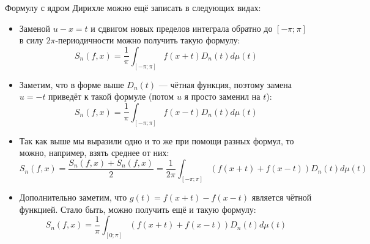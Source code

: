 \begin{note}
	Формулу с ядром Дирихле можно ещё записать в следующих видах:
	\begin{itemize}
		\item Заменой $u - x = t$ и сдвигом новых пределов интеграла обратно до $[-\pi; \pi]$ в силу $2\pi$-периодичности можно получить такую формулу:
		\[
			S_n(f, x) = \frac{1}{\pi} \int_{[-\pi; \pi]} f(x + t)D_n(t)d\mu(t)
		\]
		
		\item Заметим, что в форме выше $D_n(t)$ --- чётная функция, поэтому замена $u = -t$ приведёт к такой формуле (потом $u$ я просто заменил на $t$):
		\[
			S_n(f, x) = \frac{1}{\pi} \int_{[-\pi; \pi]} f(x - t)D_n(t)d\mu(t)
		\]
		
		\item Так как выше мы выразили одно и то же при помощи разных формул, то можно, например, взять среднее от них:
		\[
			S_n(f, x) = \frac{S_n(f, x) + S_n(f, x)}{2} = \frac{1}{2\pi} \int_{[-\pi; \pi]} (f(x + t) + f(x - t))D_n(t)d\mu(t)
		\]
		
		\item Дополнительно заметим, что $g(t) = f(x + t) - f(x - t)$ является чётной функцией. Стало быть, можно получить ещё и такую формулу:
		\[
			S_n(f, x) = \frac{1}{\pi} \int_{[0; \pi]} (f(x + t) + f(x - t))D_n(t)d\mu(t)
		\]
	\end{itemize}
\end{note}